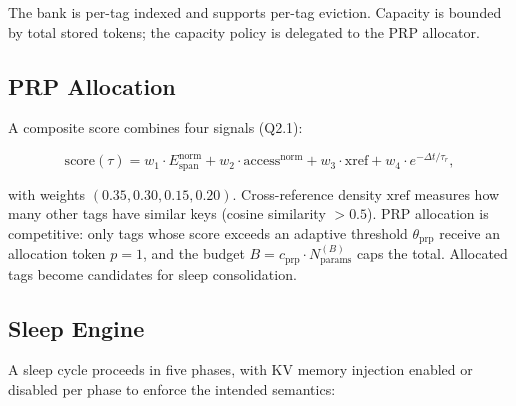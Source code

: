 The bank is per-tag indexed and supports per-tag eviction. Capacity is bounded by total stored tokens; the capacity policy is delegated to the PRP allocator.

\subsection{PRP Allocation}
\label{sec:prp}

A composite score combines four signals (Q2.1):

\begin{equation}
\label{eq:prpscore}
    \mathrm{score}(\tau) = w_1 \cdot E_{\mathrm{span}}^{\mathrm{norm}} + w_2 \cdot \mathrm{access}^{\mathrm{norm}} + w_3 \cdot \mathrm{xref} + w_4 \cdot e^{-\Delta t / \tau_r},
\end{equation}

with weights $(0.35, 0.30, 0.15, 0.20)$. Cross-reference density $\mathrm{xref}$ measures how many other tags have similar keys (cosine similarity $> 0.5$). PRP allocation is competitive: only tags whose score exceeds an adaptive threshold $\theta_{\mathrm{prp}}$ receive an allocation token $p = 1$, and the budget $B = c_{\mathrm{prp}} \cdot N_{\mathrm{params}}^{(B)}$ caps the total. Allocated tags become candidates for sleep consolidation.

\subsection{Sleep Engine}
\label{sec:sleep_engine}

A sleep cycle proceeds in five phases, with KV memory injection enabled or disabled per phase to enforce the intended semantics:

